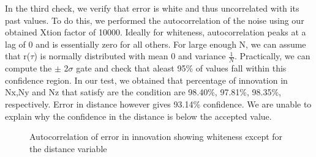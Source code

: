 \documentclass[]{article}
\begin{document}
{In the third check, we verify that error is white and thus uncorrelated with its past values. To do this, we performed the autocorrelation of the noise using our obtained Xtion factor of 10000. Ideally for whiteness, autocorrelation peaks at a lag of 0 and is essentially zero for all others. For large enough N, we can assume that r($\tau$) is normally distributed with mean 0 and variance $\frac{1}{N}$. Practically, we can compute the $\pm$ 2$\sigma$ gate and check that aleast 95\% of values fall within this confidence region. In our test, we obtained that percentage of innovation in Nx,Ny and Nz that satisfy are the condition are 98.40$\%$, 97.81\%, 98.35\%, respectively. Error in distance however gives 93.14\% confidence. We are unable to explain why the confidence in the distance is below the accepted value.
\begin{figure}[H]
	\centering     %
	\;
	\;
	\;
	\;
	\caption{Autocorrelation of error in innovation showing whiteness except for the distance variable}
	\label{fig:errorfigures}
\end{figure}


}
\end{document}

